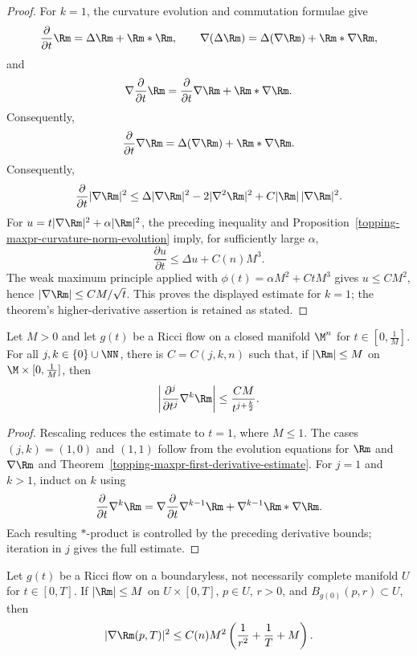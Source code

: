\begin{proof}
\sketch For $k=1$, the curvature evolution and commutation formulae give
\[
\frac{\partial}{\partial t}\Rm=\Delta\Rm+\Rm*\Rm,
\qquad
\nabla(\Delta\Rm)=\Delta(\nabla\Rm)+\Rm*\nabla\Rm,
\]
and
\[
\nabla\frac{\partial}{\partial t}\Rm
=\frac{\partial}{\partial t}\nabla\Rm+\Rm*\nabla\Rm.
\]
Consequently,
\[
\frac{\partial}{\partial t}\nabla\Rm
=\Delta(\nabla\Rm)+\Rm*\nabla\Rm.
\]
Consequently,
\[
\frac{\partial}{\partial t}|\nabla\Rm|^2
\leq\Delta|\nabla\Rm|^2-2|\nabla^2\Rm|^2
 +C|\Rm|\,|\nabla\Rm|^2.
\]
For $u=t|\nabla\Rm|^2+\alpha|\Rm|^2$, the preceding inequality and
Proposition~\ref{topping-maxpr-curvature-norm-evolution} imply, for sufficiently large $\alpha$,
\[
\frac{\partial u}{\partial t}\leq\Delta u+C(n)M^3.
\]
The weak maximum principle applied with
$\phi(t)=\alpha M^2+CtM^3$ gives $u\leq CM^2$, hence
$|\nabla\Rm|\leq CM/\sqrt t$. This proves the displayed estimate for $k=1$;
the theorem's higher-derivative assertion is retained as stated.
\end{proof}

\begin{corollary}
\label{topping-maxpr-higher-derivatives}
Let $M>0$ and let $g(t)$ be a Ricci flow on a closed manifold $\M^n$ for
$t\in[0,\frac1M]$. For all $j,k\in\{0\}\cup\NN$, there is
$C=C(j,k,n)$ such that, if $|\Rm|\leq M$ on
$\M\times[0,\frac1M]$, then
\[
\left|\frac{\partial^j}{\partial t^j}\nabla^k\Rm\right|
\leq\frac{CM}{t^{j+\frac{k}{2}}}.
\]
\end{corollary}

\begin{proof}
\sketch Rescaling reduces the estimate to $t=1$, where $M\leq1$. The cases
$(j,k)=(1,0)$ and $(1,1)$ follow from the evolution equations for $\Rm$ and
$\nabla\Rm$ and Theorem~\ref{topping-maxpr-first-derivative-estimate}. For $j=1$ and $k>1$, induct on $k$ using
\[
\frac{\partial}{\partial t}\nabla^k\Rm
=\nabla\frac{\partial}{\partial t}\nabla^{k-1}\Rm
 +\nabla^{k-1}\Rm*\nabla\Rm.
\]
Each resulting $*$-product is controlled by the preceding derivative bounds;
iteration in $j$ gives the full estimate.
\end{proof}

\begin{theorem}
\label{topping-maxpr-shi-estimate}
Let $g(t)$ be a Ricci flow on a boundaryless, not necessarily complete
manifold $U$ for $t\in[0,T]$. If $|\Rm|\leq M$ on $U\times[0,T]$, $p\in U$,
$r>0$, and $B_{g(0)}(p,r)\subset U$, then
\[
|\nabla\Rm(p,T)|^2\leq C(n)M^2
\left(\frac1{r^2}+\frac1T+M\right).
\]
\end{theorem}
